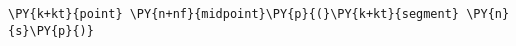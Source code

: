 \begin{Verbatim}[commandchars=\\\{\}]
    \PY{k+kt}{point} \PY{n+nf}{midpoint}\PY{p}{(}\PY{k+kt}{segment} \PY{n}{s}\PY{p}{)}
\end{Verbatim}
